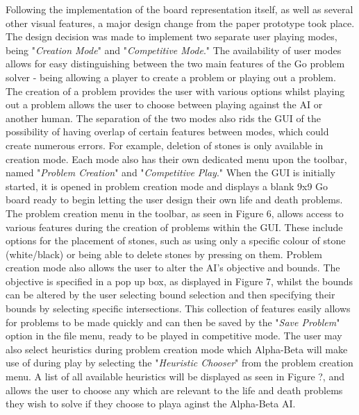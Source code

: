\documentclass{l3proj}
\begin{document}
Following the implementation of the board representation itself, as well as several other visual features, a major design change from the paper prototype took place. The design decision was made to implement two separate user playing modes, being "\textit{Creation Mode}" and "\textit{Competitive Mode}." The availability of user modes allows for easy distinguishing between the two main features of the Go problem solver - being allowing a player to create a problem or playing out a problem. The creation of a problem provides the user with various options whilst playing out a problem allows the user to choose between playing against the AI or another human. The separation of the two modes also rids the GUI of the possibility of having overlap of certain features between modes, which could create numerous errors. For example, deletion of stones is only available in creation mode. Each mode also has their own dedicated menu upon the toolbar, named "\textit{Problem Creation}" and "\textit{Competitive Play}."
When the GUI is initially started, it is opened in problem creation mode and displays a blank 9x9 Go board ready to begin letting the user design their own life and death problems. The problem creation menu in the toolbar, as seen in Figure 6, allows access to various features during the creation of problems within the GUI. These include options for the placement of stones, such as using only a specific colour of stone (white/black) or being able to delete stones by pressing on them. Problem creation mode also allows the user to alter the AI's objective and bounds. The objective is specified in a pop up box, as displayed in Figure 7, whilst the bounds can be altered by the user selecting bound selection and then specifying their bounds by selecting specific intersections. This collection of features easily allows for problems to be made quickly and can then be saved by the "\textit{Save Problem}" option in the file menu, ready to be played in competitive mode. The user may also select heuristics during problem creation mode which Alpha-Beta will make use of during play by selecting the "\textit{Heuristic Chooser}" from the problem creation menu. A list of all available heuristics will be displayed as seen in Figure ?, and allows the user to choose any which are relevant to the life and death problems they wish to solve if they choose to playa aginst the Alpha-Beta AI.
\end{document}
